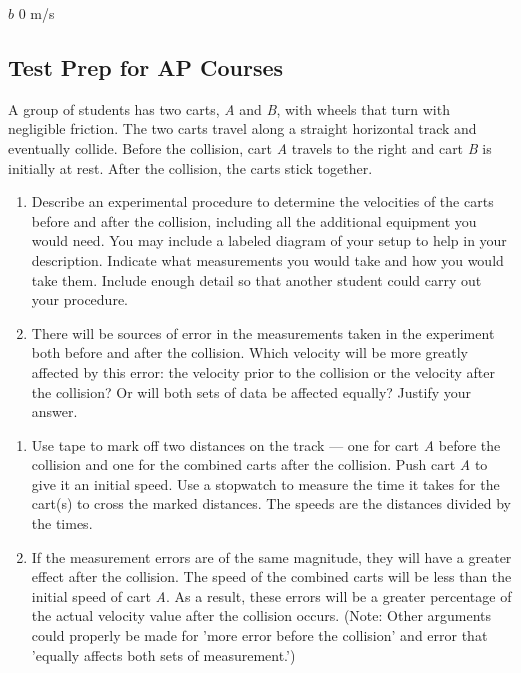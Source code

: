 \documentclass[
]{book}
\providecommand{\tightlist}{%
  \setlength{\itemsep}{0pt}\setlength{\parskip}{0pt}}
\begin{document}
\(b\) 0 m/s

\hypertarget{fs-id1283687}{}
\hypertarget{test-prep-for-ap-courses-2}{%
\subsection{Test Prep for AP Courses}\label{test-prep-for-ap-courses-2}}

\hypertarget{fs-id2172989}{}
\leavevmode{}%
A group of students has two carts, \emph{A} and \emph{B}, with wheels that turn
with negligible friction. The two carts travel along a straight
horizontal track and eventually collide. Before the collision, cart \emph{A}
travels to the right and cart \emph{B} is initially at rest. After the
collision, the carts stick together.

\begin{enumerate}
\def\labelenumi{\alph{enumi}.}
\tightlist
\item
  Describe an experimental procedure to determine the velocities of
  the carts before and after the collision, including all the
  additional equipment you would need. You may include a labeled
  diagram of your setup to help in your description. Indicate what
  measurements you would take and how you would take them. Include
  enough detail so that another student could carry out your
  procedure.
\item
  There will be sources of error in the measurements taken in the
  experiment both before and after the collision. Which velocity will
  be more greatly affected by this error: the velocity prior to the
  collision or the velocity after the collision? Or will both sets of
  data be affected equally? Justify your answer.
\end{enumerate}

\hypertarget{fs-id1336990}{}
\begin{enumerate}
\def\labelenumi{\alph{enumi}.}
\tightlist
\item
  Use tape to mark off two distances on the track --- one for cart \emph{A}
  before the collision and one for the combined carts after the
  collision. Push cart \emph{A} to give it an initial speed. Use a
  stopwatch to measure the time it takes for the cart(s) to cross the
  marked distances. The speeds are the distances divided by the times.
\item
  If the measurement errors are of the same magnitude, they will have
  a greater effect after the collision. The speed of the combined
  carts will be less than the initial speed of cart \emph{A}. As a result,
  these errors will be a greater percentage of the actual velocity
  value after the collision occurs. (Note: Other arguments could
  properly be made for 'more error before the collision' and error
  that 'equally affects both sets of measurement.')
\end{enumerate}
\end{document}
